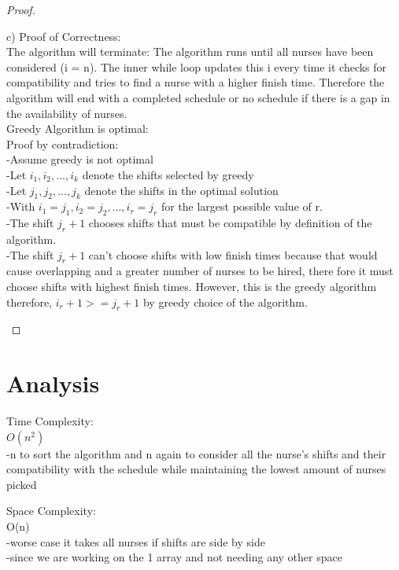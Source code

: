 \documentclass[11pt]{article}
\begin{document}
\begin{proof}
\begin{text}
c) Proof of Correctness:\\
The algorithm will terminate: The algorithm runs until all nurses have been considered (i = n). The inner while loop updates this i every time it checks for compatibility and tries to find a nurse with a higher finish time. Therefore the algorithm will end with a completed schedule or no schedule if there is a gap in the availability of nurses.\\
Greedy Algorithm is optimal: \\
Proof by contradiction:\\
-Assume greedy is not optimal\\
-Let $i_1, i_2,..., i_k$ denote the shifts selected by greedy\\
-Let $j_1,j_2,..., j_k$ denote the shifts in the optimal solution \\
-With $i_1  = j_1, i_2 = j_2, ..., i_r = j _r$ for the largest possible value of r. \\
-The shift $j_r+1$ chooses shifts that must be compatible by definition of the algorithm.\\
-The shift $j_r+1$ can't choose shifts with low finish times because that would cause overlapping and a greater number of nurses to be hired, there fore it must choose shifts with highest finish times. However, this is the greedy algorithm therefore, $i_r+1 >= j_r+1$  by greedy choice of the algorithm.
\end{text}
\end{proof}

\section*{Analysis}

\begin{text}
Time Complexity: \\
$O(n^2)$ \\
-n to sort the algorithm and n again to consider all the nurse's shifts and their compatibility with the schedule while maintaining the lowest amount of nurses picked
\end{text}

\begin{text}
Space Complexity: \\
O(n)\\
-worse case it takes all nurses if shifts are side by side\\
-since we are working on the 1 array and not needing any other space
\end{text}
\end{document}
